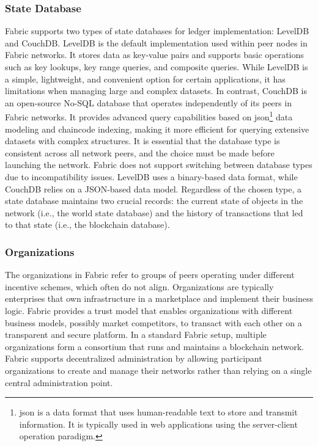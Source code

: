 \documentclass[conference]{IEEEtran}
\begin{document}
\subsubsection{State Database}
Fabric supports two types of state databases for ledger implementation: LevelDB and CouchDB. LevelDB is the default implementation used within peer nodes in Fabric networks. It stores data as key-value pairs and supports basic operations such as key lookups, key range queries, and composite queries. While LevelDB is a simple, lightweight, and convenient option for certain applications, it has limitations when managing large and complex datasets. In contrast, CouchDB is an open-source No-SQL database that operates independently of its peers in Fabric networks. It provides advanced query capabilities based on \ac{json}\footnote{\ac{json} is a data format that uses human-readable text to store and transmit information. It is typically used in web applications using the server-client operation paradigm.} data modeling and chaincode indexing, making it more efficient for querying extensive datasets with complex structures. It is essential that the database type is consistent across all network peers, and the choice must be made before launching the network. Fabric does not support switching between database types due to incompatibility issues. LevelDB uses a binary-based data format, while CouchDB relies on a JSON-based data model. Regardless of the chosen type, a state database maintains two crucial records: the current state of objects in the network (i.e., the world state database) and the history of transactions that led to that state (i.e., the blockchain database). \\

\subsubsection{Organizations}
The organizations in Fabric refer to groups of peers operating under different incentive schemes, which often do not align. Organizations are typically enterprises that own infrastructure in a marketplace and implement their business logic. Fabric provides a trust model that enables organizations with different business models, possibly market competitors, to transact with each other on a transparent and secure platform. In a standard Fabric setup, multiple organizations form a consortium that runs and maintains a blockchain network. Fabric supports decentralized administration by allowing participant organizations to create and manage their networks rather than relying on a single central administration point.\\
\end{document}
